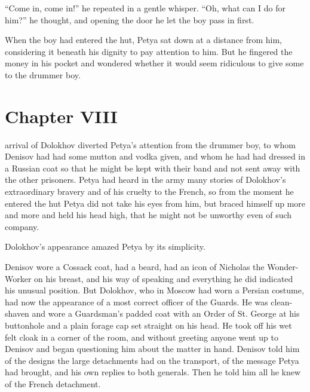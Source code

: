 ``Come in, come in!'' he repeated in a gentle whisper. ``Oh, what
can I do for him?'' he thought, and opening the door he let the
boy pass in first.

When the boy had entered the hut, Petya sat down at a distance
from him, considering it beneath his dignity to pay attention to
him. But he fingered the money in his pocket and wondered whether
it would seem ridiculous to give some to the drummer boy.


\chapter*{Chapter VIII} \ifaudio {}
\fi

 arrival of Dolokhov diverted Petya's attention from the
drummer boy, to whom Denisov had had some mutton and vodka given,
and whom he had had dressed in a Russian coat so that he might be
kept with their band and not sent away with the other
prisoners. Petya had heard in the army many stories of Dolokhov's
extraordinary bravery and of his cruelty to the French, so from
the moment he entered the hut Petya did not take his eyes from
him, but braced himself up more and more and held his head high,
that he might not be unworthy even of such company.

Dolokhov's appearance amazed Petya by its simplicity.

Denisov wore a Cossack coat, had a beard, had an icon of Nicholas
the Wonder-Worker on his breast, and his way of speaking and
everything he did indicated his unusual position. But Dolokhov,
who in Moscow had worn a Persian costume, had now the appearance
of a most correct officer of the Guards. He was clean-shaven and
wore a Guardsman's padded coat with an Order of St. George at his
buttonhole and a plain forage cap set straight on his head. He
took off his wet felt cloak in a corner of the room, and without
greeting anyone went up to Denisov and began questioning him
about the matter in hand. Denisov told him of the designs the
large detachments had on the transport, of the message Petya had
brought, and his own replies to both generals. Then he told him
all he knew of the French detachment.

